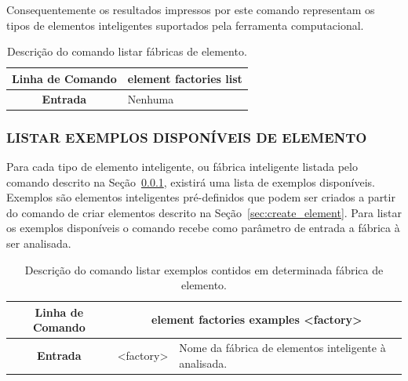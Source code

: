 \documentclass[a4paper,12pt]{monografia}
\theoremstyle{plain}
\theoremstyle{definition}
\theoremstyle{remark}
\begin{document}
Consequentemente os resultados impressos por este comando representam os tipos de elementos inteligentes suportados pela ferramenta computacional.

\begin{center}
	\begin{table}[!htbp]
		\begin{tabular}{|c|m{}|}
			\hline
			\textbf{Linha de Comando} & \multicolumn{1}{c|}{element factories list} \\
			\hline
			\textbf{Entrada} & Nenhuma \\
			\hline
		\end{tabular}
		\caption{Descrição do comando listar fábricas de elemento.}
		\label{tab:list_element_factories}
	\end{table}
\end{center}

\subsubsection{LISTAR EXEMPLOS DISPONÍVEIS DE ELEMENTO}\label{sec:list_example_element_factories}

Para cada tipo de elemento inteligente, ou fábrica inteligente listada pelo comando descrito na Seção~\ref{sec:list_example_element_factories}, existirá uma lista de exemplos disponíveis. Exemplos são elementos inteligentes pré-definidos que podem ser criados a partir do comando de criar elementos descrito na Seção~\ref{sec:create_element}. Para listar os exemplos disponíveis o comando recebe como parâmetro de entrada a fábrica à ser analisada.

\begin{center}
	\begin{table}[!htbp]
		\begin{tabular}{|c|c|m{}|}
			\hline
			\textbf{Linha de Comando} & \multicolumn{2}{c|}{element factories examples <factory>} \\
			\hline
			\textbf{Entrada} & <factory> & Nome da fábrica de elementos inteligente à analisada. \\
			\hline
		\end{tabular}
		\caption{Descrição do comando listar exemplos contidos em determinada fábrica de elemento.}
		\label{tab:list_element_ex_factories}
	\end{table}
\end{center}
\end{document}

